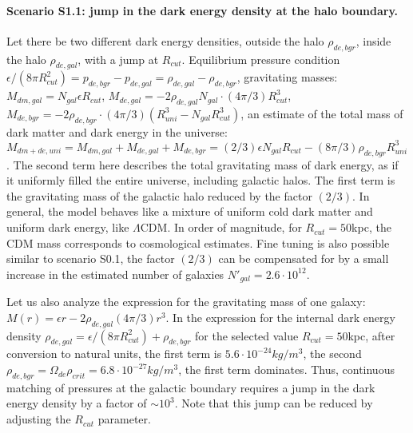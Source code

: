 \documentclass{article}
\begin{document}
\paragraph {Scenario S1.1: jump in the dark energy density at the halo boundary.} Let there be two different dark energy densities, outside the halo $ \rho_ {de, bgr} $, inside the halo $ \rho_ {de, gal} $, with a jump at $ R_ {cut} $. Equilibrium pressure condition $ \epsilon / (8 \pi R_ {cut} ^ 2) = p_ {de, bgr} -p_ {de, gal} = \rho_ {de, gal} - \rho_ {de, bgr} $, gravitating masses: $ M_ {dm, gal} = N_ {gal} \epsilon R_ {cut} $, $ M_ {de, gal} = - 2 \rho_ {de, gal} N_ {gal} \cdot (4 \pi / 3) R_ {cut} ^ 3 $, $ M_ {de, bgr} = - 2 \rho_ {de, bgr} \cdot (4 \pi / 3) (R_ {uni} ^ 3-N_ {gal} R_ {cut} ^ 3) $, an estimate of the total mass of dark matter and dark energy in the universe: $ M_ {dm + de, uni} = M_ {dm, gal} + M_ {de, gal} + M_ {de, bgr} = (2/3) \epsilon N_ {gal} R_ {cut} - (8 \pi / 3) \rho_ {de, bgr} R_ {uni} ^ 3 $. The second term here describes the total gravitating mass of dark energy, as if it uniformly filled the entire universe, including galactic halos. The first term is the gravitating mass of the galactic halo reduced by the factor $ (2/3) $. In general, the model behaves like a mixture of uniform cold dark matter and uniform dark energy, like $ \Lambda $CDM. In order of magnitude, for $ R_ {cut} = 50 $kpc, the CDM mass corresponds to cosmological estimates. Fine tuning is also possible similar to scenario S0.1, the factor $ (2/3) $ can be compensated for by a small increase in the estimated number of galaxies $ N '_ {gal} = 2.6 \cdot10 ^ {12} $.

Let us also analyze the expression for the gravitating mass of one galaxy: $ M (r) = \epsilon r -2 \rho_ {de, gal} (4 \pi / 3) r ^ 3 $. In the expression for the internal dark energy density $ \rho_ {de, gal} = \epsilon / (8 \pi R_ {cut} ^ 2) + \rho_ {de, bgr} $ for the selected value $ R_ {cut} = 50 $kpc, after conversion to natural units, the first term is $ 5.6 \cdot10 ^ {- 24} kg / m ^ 3 $, the second $ \rho_ {de, bgr} = \Omega_ {de} \rho_ {crit} = 6.8 \cdot10 ^ {- 27} kg / m ^ 3 $, the first term dominates. Thus, continuous matching of pressures at the galactic boundary requires a jump in the dark energy density by a factor of $ \sim10 ^ 3 $. Note that this jump can be reduced by adjusting the $ R_ {cut} $ parameter.
\end{document}
